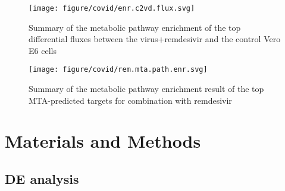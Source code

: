 \documentclass[12pt,twoside,openany,\mydriver]{thesis}  %
\begin{document}
\begin{figure}
\texttt{[image: figure/covid/enr.c2vd.flux.svg]} \caption{Summary of the metabolic pathway enrichment of the top differential fluxes between the virus+remdesivir and the control Vero E6 cells}\label{fig:covid-rem-flux-pathway}
\end{figure}
\begin{figure}
\texttt{[image: figure/covid/rem.mta.path.enr.svg]} \caption{Summary of the metabolic pathway enrichment result of the top MTA-predicted targets for combination with remdesivir}\label{fig:covid-rem-mta-pathway}
\end{figure}
\hypertarget{materials-and-methods-2}{%
\section{Materials and Methods}\label{materials-and-methods-2}}

\hypertarget{de-analysis}{%
\subsection{DE analysis}\label{de-analysis}}
\end{document}
